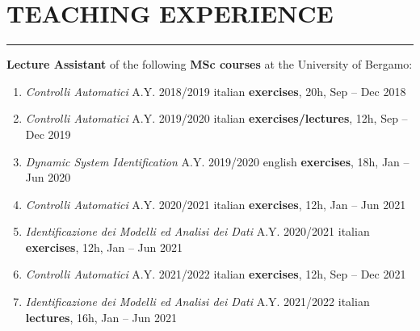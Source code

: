 \documentclass[10pt]{article}
\newcommand{\cvsection}[1]{\section*{\centering\normalsize\uppercase{#1}}\vspace{-16pt}\rule{\linewidth}{0.2pt}\vspace{6pt}}
\begin{document}

\cvsection{teaching experience}

\textbf{Lecture Assistant} of the following \textbf{MSc courses} at the University of Bergamo:
\vspace{-6pt}
\begin{enumerate}
	\setlength\itemsep{-6pt}
	\item \textit{Controlli Automatici} A.Y. 2018/2019 \hfill italian \textbf{exercises}, 20h, Sep – Dec 2018\\
	\item \textit{Controlli Automatici} A.Y. 2019/2020 \hfill italian \textbf{exercises/lectures}, 12h, Sep – Dec 2019\\
	\item \textit{Dynamic System Identification} A.Y. 2019/2020 \hfill english \textbf{exercises}, 18h, Jan – Jun 2020\\
	\item \textit{Controlli Automatici} A.Y. 2020/2021 \hfill italian \textbf{exercises}, 12h, Jan – Jun 2021\\
	\item \textit{Identificazione dei Modelli ed Analisi dei Dati} A.Y. 2020/2021 \hfill italian \textbf{exercises}, 12h, Jan – Jun 2021
	\item \textit{Controlli Automatici} A.Y. 2021/2022 \hfill italian \textbf{exercises}, 12h, Sep – Dec 2021
	\item \textit{Identificazione dei Modelli ed Analisi dei Dati} A.Y. 2021/2022 \hfill italian \textbf{lectures}, 16h, Jan – Jun 2021
\end{enumerate}

\vspace{6pt} %
\end{document}
